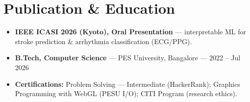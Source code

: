 \documentclass[10pt,a4paper]{article}
\begin{document}
\section*{Publication \& Education}
\begin{itemize}
\item \textbf{IEEE ICASI 2026 (Kyoto), Oral Presentation} --- interpretable ML for stroke prediction \& arrhythmia classification (ECG/PPG).
\item \textbf{B.Tech, Computer Science} --- PES University, Bangalore --- 2022 -- Jul 2026
\item \textbf{Certifications:} Problem Solving --- Intermediate (HackerRank); Graphics Programming with WebGL (PESU I/O); CITI Program (research ethics).
\end{itemize}
\end{document}

